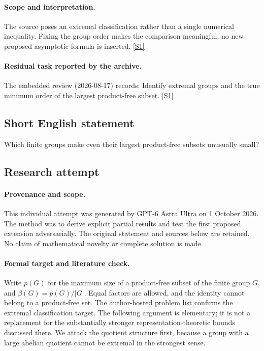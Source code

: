 \documentclass[11pt,a4paper]{article}
\newcommand{\sref}[2]{\hyperlink{source:#1:#2}{[S#2]}}
\begin{document}
\paragraph{Scope and interpretation.}

The source poses an extremal classification rather than a single numerical inequality. Fixing the group order makes the comparison meaningful; no new proposed asymptotic formula is inserted. \sref{95}{1}

\paragraph{Residual task reported by the archive.}

The embedded review (2026-08-17) records: Identify extremal groups and the true minimum order of the largest product-free subset. \sref{95}{1}

\subsection{Short English statement}

Which finite groups make even their largest product-free subsets unusually small?

\subsection{Research attempt}

\paragraph{Provenance and scope.}
This individual attempt was generated by GPT-6 Astra Ultra on 1 October 2026. The method was to derive explicit partial results and test the first proposed extension adversarially. The original statement and sources below are retained. No claim of mathematical novelty or complete solution is made.

\paragraph{Formal target and literature check.}
Write $p(G)$ for the maximum size of a product-free subset of the finite group $G$, and $\beta(G)=p(G)/|G|$. Equal factors are allowed, and the identity cannot belong to a product-free set. The author-hosted problem list confirms the extremal classification target. The following argument is elementary; it is not a replacement for the substantially stronger representation-theoretic bounds discussed there. We attack the quotient structure first, because a group with a large abelian quotient cannot be extremal in the strongest sense.
\end{document}
